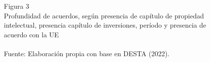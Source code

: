 \documentclass[a4paper]{tufte-handout}
\begin{document}
\begin{figure}[h!]
\captionsetup[subfigure]{labelformat=empty}
  \centering
  \smallskip\noindent\small Figura 3 \\ Profundidad de acuerdos, según presencia de capítulo de propiedad intelectual, presencia capítulo de inversiones, período y presencia de acuerdo con la UE
  \\
  \\ \smallskip\noindent\scriptsize Fuente: Elaboración propia con base en DESTA (2022).
\end{figure}
\end{document}
